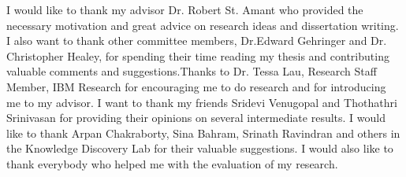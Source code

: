 \begin{acknowledgements}

I would like to thank my advisor Dr. Robert St. Amant who provided the necessary motivation and great advice on research ideas and dissertation writing. I also want to thank other committee members, Dr.Edward Gehringer and Dr. Christopher Healey,  for spending their time reading my thesis and contributing valuable comments and suggestions.Thanks to Dr. Tessa Lau, Research Staff Member, IBM Research for encouraging me to do research and for introducing me to my advisor. I want to thank my friends Sridevi Venugopal and Thothathri Srinivasan for providing their opinions on several intermediate results. I would like to thank Arpan Chakraborty, Sina Bahram, Srinath Ravindran and others in the Knowledge Discovery Lab for their valuable suggestions. I would also like to thank everybody who helped me with the evaluation of my research.

\end{acknowledgements}


\thesistableofcontents

\thesislistoftables

\thesislistoffigures
